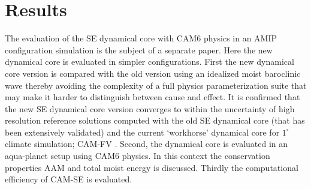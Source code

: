 \documentclass{agujournal}
\begin{document}
\section{Results}\label{sec:results}
The evaluation of the SE dynamical core with CAM6 physics in an AMIP configuration simulation is the subject of a separate paper. Here the new dynamical core is evaluated in simpler configurations. First the new dynamical core version is compared with the old version using an idealized moist baroclinic wave thereby avoiding the complexity of a full physics parameterization suite that may make it harder to distinguish between cause and effect. It is confirmed that the new SE dynamical core version converges to within the uncertainty of high resolution reference solutions computed with the old SE dynamical core (that has been extensively validated) and the current `workhorse' dynamical core for $1^\circ$ climate simulation; CAM-FV \citep[finite-volume][]{L2004MWR}. Second, the dynamical core is evaluated in an aqua-planet setup \citep{NH2000ASL,WetAl2012NCAR,MWO2016JAMES} using CAM6 physics. In this context the conservation properties AAM and total moist energy is discussed. Thirdly the computational efficiency of CAM-SE is evaluated.
\end{document}
